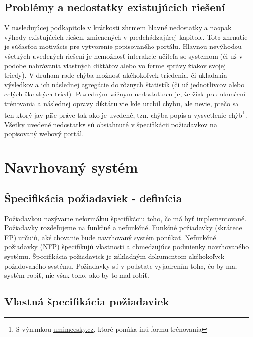\documentclass[12pt,oneside]{fithesis2}
\begin{document}
       		\subsection{Problémy a nedostatky existujúcich riešení}
	\par V nasledujúcej podkapitole v krátkosti zhrniem hlavné nedostatky a naopak výhody existujúcich riešení zmienených v predchádzajúcej kapitole. Toto zhrnutie je súčasťou motivácie pre vytvorenie popisovaného portálu. Hlavnou nevýhodou všetkých uvedených riešení je nemožnosť interakcie učiteľa so systémom (či už v podobe nahrávania vlastných diktátov alebo vo forme správy žiakov svojej triedy). V druhom rade chýba možnosť akéhokoľvek triedenia, či ukladania výsledkov a ich následnej agregácie do rôznych štatistík (či už jednotlivcov alebo celých školských tried). Posledným vážnym nedostatkom je, že žiak po dokončení trénovania a následnej opravy diktátu vie kde urobil chybu, ale nevie, prečo sa ten ktorý jav píše práve tak ako je uvedené, tzn. chýba popis a vysvetlenie chýb\footnote{S výnimkou \url{umimcesky.cz}, ktoré ponúka inú formu trénovania}. Všetky uvedené nedostatky sú obsiahnuté v špecifikácii požiadavkov na popisovaný webový portál.
	
	\pagebreak


	\section{Navrhovaný systém}
       		\subsection{Špecifikácia požiadaviek - definícia} 
\par Požiadavkou nazývame neformálnu špecifikáciu toho, čo má byť implementované. Požiadavky rozdeľujeme na funkčné a nefunkčné. Funkčné požiadavky (skrátene FP) určujú, aké chovanie bude navrhovaný systém ponúkať. Nefunkčné požiadavky (NFP) špecifikujú vlastnosti a obmedzujúce podmienky navrhovaného systému. Špecifikácia požiadaviek je základným dokumentom akéhokoľvek požadovaného systému. Požiadavky sú v podstate vyjadrením toho, čo by mal systém robiť, nie však toho, ako by to mal robiť\cite{arlow11}.
       		
       		\subsection{Vlastná špecifikácia požiadaviek} \label{spec-app}
       		
\end{document}
